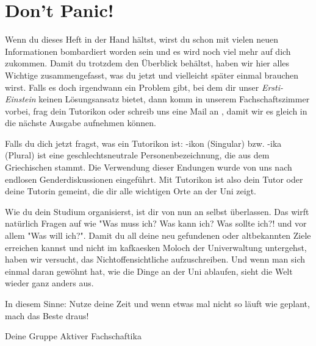 %
%

\section{Don't Panic!}

Wenn du dieses Heft in der Hand hältst, wirst du schon mit vielen neuen Informationen bombardiert worden sein und es wird noch viel mehr auf dich zukommen. Damit du trotzdem den Überblick behältst, haben wir hier alles Wichtige zusammengefasst, was du jetzt und vielleicht später einmal brauchen wirst. Falls es doch irgendwann ein Problem gibt, bei dem dir unser \emph{Ersti-Einstein} keinen Lösungsansatz bietet, dann komm in unserem Fachschaftszimmer vorbei, frag dein Tutorikon oder schreib uns eine Mail an , damit wir es gleich in die nächste Ausgabe aufnehmen können. 

Falls du dich jetzt fragst, was ein Tutorikon ist: -ikon (Singular) bzw. -ika (Plural) ist eine geschlechtsneutrale Personenbezeichnung, die aus dem Griechischen stammt. Die Verwendung dieser Endungen wurde von uns nach endlosen Genderdiskussionen eingeführt. Mit Tutorikon ist also dein Tutor oder deine Tutorin gemeint, die dir alle wichtigen Orte an der Uni zeigt.

Wie du dein Studium organisierst, ist dir von nun an selbst überlassen. Das wirft natürlich Fragen auf wie "Was muss ich? Was kann ich? Was sollte ich?! und vor allem "Was will ich?". Damit du all deine neu gefundenen oder altbekannten Ziele erreichen kannst und nicht im kafkaesken Moloch der Univerwaltung untergehst, haben wir versucht, das Nichtoffensichtliche aufzuschreiben. Und wenn man sich einmal daran gewöhnt hat, wie die Dinge an der Uni ablaufen, sieht die Welt wieder ganz anders aus.

In diesem Sinne: Nutze deine Zeit und wenn etwas mal nicht so läuft wie geplant, mach das Beste draus!

Deine Gruppe Aktiver Fachschaftika
